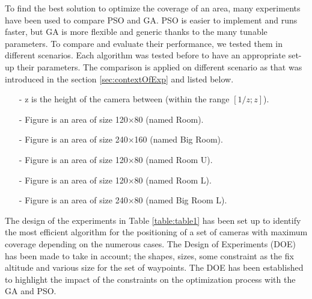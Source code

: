 To find the best solution to optimize the coverage of an area, many experiments have been used to compare PSO and GA. PSO is easier to implement and runs faster, but GA is more flexible and generic thanks to the many tunable parameters. 
To compare and evaluate their performance, we tested them in different scenarios. Each algorithm was tested  before to have an appropriate set-up their parameters. 
The comparison is applied on different scenario as that was introduced in the section \ref{sec:contextOfExp} and listed below. 






\begin{itemize}
\item[-]    z is the height of the camera between (within the range $[1/z;z]$).
\item[-]	Figure  is an area of size 120$\times$80 (named Room). 
\item[-]	Figure  is an area of size 240$\times$160 (named Big Room).
\item[-]	Figure  is an area of size 120$\times$80 (named Room U).
\item[-]	Figure  is an area of size 120$\times$80 (named Room L).
\item[-]	Figure  is an area of size 240$\times$80 (named Big Room L).
\end{itemize}


The design of the experiments in Table \ref{table:table1} has been set up to identify the most efficient algorithm for the positioning of a set of cameras with maximum coverage depending on the numerous cases. 
The Design of Experiments (DOE) has been made to take in account; the  shapes, sizes, some constraint as the fix altitude and  various size for the set of waypoints. The DOE has been established to highlight the impact of the constraints on the optimization process with the GA and PSO.


